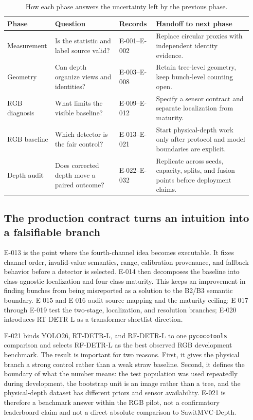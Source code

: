 \documentclass[preprint,12pt]{elsarticle}
\begin{document}
\begin{table}[H]
\centering
\small
\caption{How each phase answers the uncertainty left by the previous phase.}
\label{tab:phase-handoffs}
\begin{tabularx}{\columnwidth}{L{0.19\columnwidth}L{0.24\columnwidth}L{0.22\columnwidth}Y}
\toprule
Phase & Question & Records & Handoff to next phase\\
\midrule
Measurement & Is the statistic and label source valid? & E-001--E-002 & Replace circular proxies with independent identity evidence.\\
Geometry & Can depth organize views and identities? & E-003--E-008 & Retain tree-level geometry, keep bunch-level counting open.\\
RGB diagnosis & What limits the visible baseline? & E-009--E-012 & Specify a sensor contract and separate localization from maturity.\\
RGB baseline & Which detector is the fair control? & E-013--E-021 & Start physical-depth work only after protocol and model boundaries are explicit.\\
Depth audit & Does corrected depth move a paired outcome? & E-022--E-032 & Replicate across seeds, capacity, splits, and fusion points before deployment claims.\\
\bottomrule
\end{tabularx}
\end{table}

\subsection{The production contract turns an intuition into a falsifiable branch}
E-013 is the point where the fourth-channel idea becomes executable. It fixes
channel order, invalid-value semantics, range, calibration provenance, and
fallback behavior before a detector is selected. E-014 then decomposes the
baseline into class-agnostic localization and four-class maturity. This keeps
an improvement in finding bunches from being misreported as a solution to the
B2/B3 semantic boundary. E-015 and E-016 audit source mapping and the maturity
ceiling; E-017 through E-019 test the two-stage, localization, and resolution
branches; E-020 introduces RT-DETR-L as a transformer shortlist direction.

E-021 binds YOLO26, RT-DETR-L, and RF-DETR-L to one \texttt{pycocotools}
comparison and selects RF-DETR-L as the best observed RGB development
benchmark. The result is important for two reasons. First, it gives the
physical branch a strong control rather than a weak straw baseline. Second,
it defines the boundary of what the number means: the test population was
used repeatedly during development, the bootstrap unit is an image rather
than a tree, and the physical-depth dataset has different priors and sensor
availability. E-021 is therefore a benchmark answer within the RGB pilot,
not a confirmatory leaderboard claim and not a direct absolute comparison to
SawitMVC-Depth.
\end{document}
